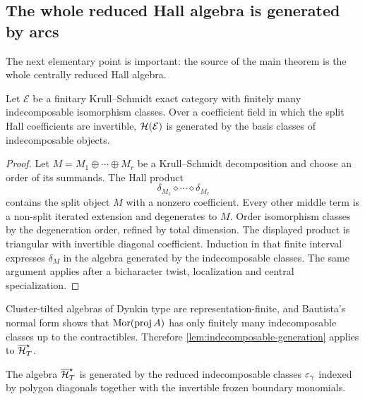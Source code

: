 \subsection{The whole reduced Hall algebra is generated by arcs}

The next elementary point is important: the source of the main theorem is the
whole centrally reduced Hall algebra.

\begin{lemma}
\label{lem:indecomposable-generation}
Let $\mathcal E$ be a finitary Krull--Schmidt exact category with finitely many
indecomposable isomorphism classes.  Over a coefficient field in which the
split Hall coefficients are invertible, $\mathcal H(\mathcal E)$ is generated by
the basis classes of indecomposable objects.
\end{lemma}

\begin{proof}
Let $M=M_1\oplus\cdots\oplus M_r$ be a Krull--Schmidt decomposition and
choose an order of its summands.  The Hall product
\[
 \delta_{M_1}\diamond\cdots\diamond\delta_{M_r}
\]
contains the split object $M$ with a nonzero coefficient.  Every other middle
term is a non-split iterated extension and degenerates to $M$.  Order
isomorphism classes by the degeneration order, refined by total dimension.
The displayed product is triangular with invertible diagonal coefficient.
Induction in that finite interval expresses $\delta_M$ in the algebra
generated by the indecomposable classes.  The same argument applies after a
bicharacter twist, localization and central specialization.
\end{proof}

Cluster-tilted algebras of Dynkin type are representation-finite, and
Bautista's normal form shows that $\operatorname{Mor}(\operatorname{proj} A)$ has only finitely many
indecomposable classes up to the contractibles.  Therefore
\cref{lem:indecomposable-generation} applies to $\overline{\mathcal H}_{T}^{\star}$.

\begin{corollary}
\label{cor:arc-generation}
The algebra $\overline{\mathcal H}_{T}^{\star}$ is generated by the reduced indecomposable classes
$\varepsilon_\gamma$ indexed by polygon diagonals together with the invertible frozen
boundary monomials.
\end{corollary}

